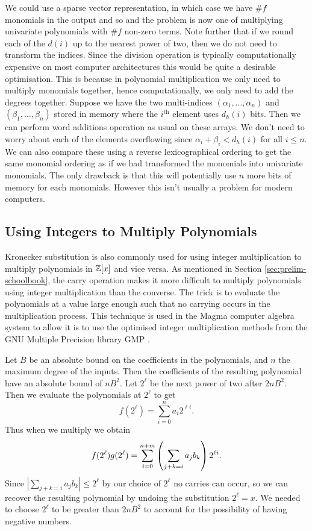 We could use a sparse vector representation, in which case we have $\# f$ monomials in the output and so and the problem is now one of multiplying univariate polynomials with $\# f$ non-zero terms. Note further that if we round each of the $d(i)$ up to the nearest power of two, then we do not need to transform the indices. Since the division operation is typically computationally expensive on most computer architectures\cite{instruction-times} this would be quite a desirable optimisation. This is because in polynomial multiplication we only need to multiply monomials together, hence computationally, we only need to add the degrees together. Suppose we have the two multi-indices $(\alpha_1, \ldots, \alpha_n)$ and $(\beta_1, \ldots, \beta_n)$ stored in memory where the $i^{\text{th}}$ element uses $d_h(i)$ bits. Then we can perform word additions operation as usual on these arrays. We don't need to worry about each of the elements overflowing since $\alpha_i + \beta_i < d_h(i)$ for all $i \le n$. We can also compare these using a reverse lexicographical ordering to get the same monomial ordering as if we had transformed the monomials into univariate monomials. The only drawback is that this will potentially use $n$ more bits of memory for each monomials. However this isn't usually a problem for modern computers.

\medskip

\subsection{Using Integers to Multiply Polynomials}%
\label{sub:integers-for-poly-mult}

Kronecker substitution is also commonly used for using integer multiplication to multiply polynomials in ${\mathbb Z}[x]$ and vice versa. As mentioned in Section \ref{sec:prelim-schoolbook}, the carry operation makes it more difficult to multiply polynomials using integer multiplication than the converse. The trick is to evaluate the polynomials at a value large enough such that no carrying occurs in the multiplication process. This technique is used in the Magma computer algebra system to allow it is to use the optimised integer multiplication methods from the GNU Multiple Precision library GMP \cite{magma}.

Let $B$ be an absolute bound on the coefficients in the polynomials, and $n$ the maximum degree of the inputs. Then the coefficients of the resulting polynomial have an absolute bound of $nB^2$. Let $2^\ell$ be the next power of two after $2nB^2$. Then we evaluate the polynomials at $2^\ell$ to get
\[
    f(2^\ell) = \sum^n_{i = 0} a_i 2^{\ell i}.
\]
Thus when we multiply we obtain
\[
    f(2^\ell)g(2^\ell) = \sum^{n+m}_{i=0} \left(\sum_{j + k = i} a_jb_k\right)2^{\ell i}.
\]
Since $|\sum_{j + k = i}a_j b_k| \leq 2^{\ell}$ by our choice of $2^\ell$ no carries can occur, so we can recover the resulting polynomial by undoing the substitution $2^\ell = x$. We needed to choose $2^\ell$ to be greater than $2nB^2$ to account for the possibility of having negative numbers.

